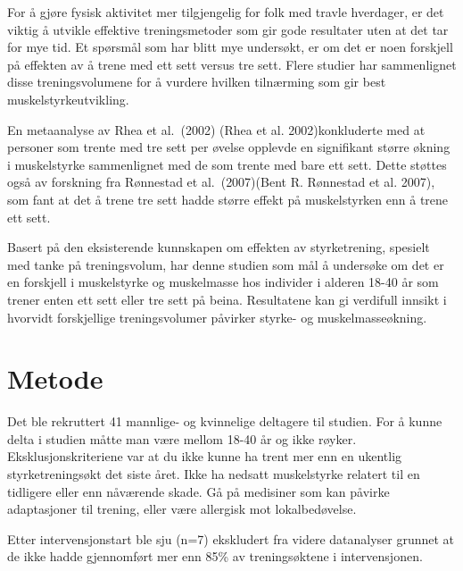\documentclass[
  letterpaper,
  DIV=11,
  numbers=noendperiod]{scrreprt}
\begin{document}
For å gjøre fysisk aktivitet mer tilgjengelig for folk med travle
hverdager, er det viktig å utvikle effektive treningsmetoder som gir
gode resultater uten at det tar for mye tid. Et spørsmål som har blitt
mye undersøkt, er om det er noen forskjell på effekten av å trene med
ett sett versus tre sett. Flere studier har sammenlignet disse
treningsvolumene for å vurdere hvilken tilnærming som gir best
muskelstyrkeutvikling.

En metaanalyse av Rhea et al.~(2002) (Rhea et al. 2002)konkluderte med
at personer som trente med tre sett per øvelse opplevde en signifikant
større økning i muskelstyrke sammenlignet med de som trente med bare ett
sett. Dette støttes også av forskning fra Rønnestad et al.~(2007)(Bent
R. Rønnestad et al. 2007), som fant at det å trene tre sett hadde større
effekt på muskelstyrken enn å trene ett sett.

Basert på den eksisterende kunnskapen om effekten av styrketrening,
spesielt med tanke på treningsvolum, har denne studien som mål å
undersøke om det er en forskjell i muskelstyrke og muskelmasse hos
individer i alderen 18-40 år som trener enten ett sett eller tre sett på
beina. Resultatene kan gi verdifull innsikt i hvorvidt forskjellige
treningsvolumer påvirker styrke- og muskelmasseøkning.


\chapter{Metode}\label{metode-4}

Det ble rekruttert 41 mannlige- og kvinnelige deltagere til studien. For
å kunne delta i studien måtte man være mellom 18-40 år og ikke røyker.
Eksklusjonskriteriene var at du ikke kunne ha trent mer enn en ukentlig
styrketreningsøkt det siste året. Ikke ha nedsatt muskelstyrke relatert
til en tidligere eller enn nåværende skade. Gå på medisiner som kan
påvirke adaptasjoner til trening, eller være allergisk mot
lokalbedøvelse.

Etter intervensjonstart ble sju (n=7) ekskludert fra videre datanalyser
grunnet at de ikke hadde gjennomført mer enn 85\% av treningsøktene i
intervensjonen.
\end{document}
